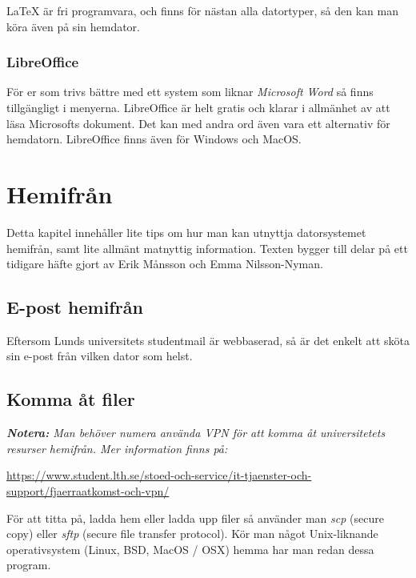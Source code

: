 \documentclass[a4paper,twocolumn]{book}
\begin{document}
\LaTeX{} är fri programvara, och finns för nästan alla datortyper, så
den kan man köra även på sin hemdator.

\subsection{LibreOffice}

För er som trivs bättre med ett system som liknar \emph{Microsoft Word}
så finns  tillgängligt i menyerna. LibreOffice är helt
gratis och klarar i allmänhet av att läsa Microsofts dokument. Det kan med
andra ord även vara ett alternativ för hemdatorn. LibreOffice finns även för
Windows och MacOS.


\chapter{Hemifrån}
\label{cha:hemifran}

Detta kapitel innehåller lite tips om hur man kan utnyttja datorsystemet
hemifrån, samt lite allmänt matnyttig information. Texten bygger till
delar på ett tidigare häfte gjort av Erik Månsson och Emma Nilsson-Nyman.

\section{E-post hemifrån}

Eftersom Lunds universitets studentmail är webbaserad, så är det enkelt att
sköta sin e-post från vilken dator som helst.


\section{Komma åt filer}

\emph{\textbf{Notera:} Man behöver numera använda VPN för att komma åt 
universitetets resurser hemifrån. Mer information finns på:}

\url{https://www.student.lth.se/stoed-och-service/it-tjaenster-och-support/fjaerraatkomst-och-vpn/}

För att titta på, ladda hem eller ladda upp filer så använder man \emph{scp}
(secure copy) eller \emph{sftp} (secure file transfer protocol). Kör man något
Unix-liknande operativsystem (Linux, BSD, MacOS / OSX) hemma har man redan dessa
program.
\end{document}
